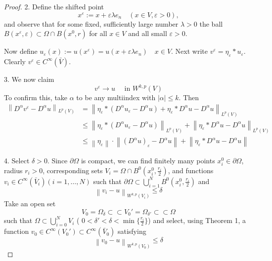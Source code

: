 \begin{theorem}
\begin{proof}
        2. Define the shifted point
        $$
            x^{\varepsilon} := x + \varepsilon \lambda  e_n \quad(x \in V, \varepsilon>0),
        $$
        and observe that for some fixed, sufficiently large number $\lambda>0$ the ball $B\left(x^{\varepsilon}, \varepsilon\right) \subset \Omega \cap B\left(x^0, r\right)$ for all $x \in V$ and all small $\varepsilon>0$.

        Now define $u_{\varepsilon}(x):=u\left(x^{\varepsilon}\right) = u(x + \varepsilon \lambda  e_n) \quad x \in V$. Next write $v^{\varepsilon}=\eta_{\varepsilon} * u_{\varepsilon}$. Clearly $v^{\varepsilon} \in C^{\infty}(\bar{V})$.

        3. We now claim
        $$
            v^{\varepsilon} \rightarrow u \quad \text { in } W^{k, p}(V)
        $$
        To confirm this, take $\alpha$ to be any multiindex with $\left|\alpha\right| \leq k$. Then
        $$\begin{aligned}
                \left\|D^\alpha v^{\varepsilon}-D^\alpha u\right\|_{L^p(V)} & =\left\|\eta_\varepsilon * (D^\alpha u_{\varepsilon}-D^\alpha u)+\eta_{\varepsilon} * D^\alpha u - D^\alpha u \right\|_{L^p(V)}                                    \\
                                                                            & \leq \left\|\eta_\varepsilon * (D^\alpha u_{\varepsilon}-D^\alpha u) \right\|_{L^p(V)}+
                \left\|\eta_{\varepsilon} * D^\alpha u - D^\alpha u \right\|_{L^p(V)}                                                                                                                                                            \\
                                                                            & \leq \left\|\eta_\varepsilon \right\| \cdot \left\|(D^\alpha u)_{\varepsilon}-D ^ \alpha u \right\| + \left\|\eta_{\varepsilon} * D^\alpha u - D^\alpha u \right\|
            \end{aligned}
        $$

        4. Select $\delta>0$. Since $\partial \Omega$ is compact, we can find finitely many points $x_i^0 \in \partial \Omega$, radius $r_i>0$, corresponding sets $V_i=\Omega \cap B^0\left(x_i^0, \frac{r_i}{2}\right)$, and functions $v_i \in C^{\infty}\left(\bar{V}_i\right)(i=1, \ldots, N)$ such that $\partial \Omega \subset \bigcup_{i=1}^N B^0\left(x_i^0, \frac{r_i}{2}\right)$ and
        $$
            \left\|v_i-u\right\|_{W^{k, p}\left(V_i\right)} \leq \delta
        $$
        Take an open set
        $$
            V_0 =\Omega_\delta \subset\subset V_0'=\Omega_{\delta'}\subset\subset \Omega
        $$
        such that $\Omega \subset \bigcup_{i=0}^N V_i$ ( $0 <\delta'< \delta <\min\{\frac{r_i}{2}\}$) and select, using Theorem 1, a function $v_0 \in C^{\infty}\left(V_0'\right) \subset C^{\infty}\left(\bar{V}_0\right)$ satisfying
        $$
            \left\|v_0-u\right\|_{W^{k, p}\left(V_0\right)} \leq \delta
        $$


\end{proof}
\end{theorem}
